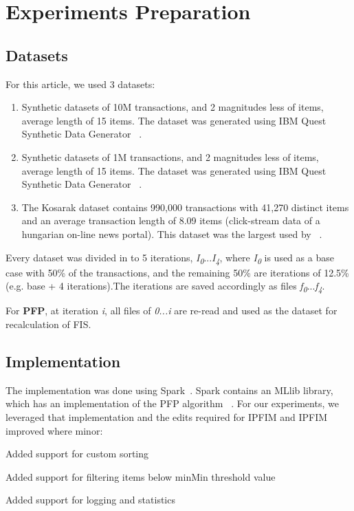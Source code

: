\section{Experiments Preparation}

\subsection{Datasets}
For this article, we used 3 datasets:
\begin{enumerate}
\item  \label{data:10Msynt} Synthetic datasets of 10M transactions, and 2 magnitudes less of items, average length of 15 items. The dataset was generated using IBM Quest Synthetic Data Generator ~\cite{agrawal1994quest}. 
\item \label{data:1Msynt} Synthetic datasets of 1M transactions, and 2 magnitudes less of items, average length of 15 items. The dataset was generated using IBM Quest Synthetic Data Generator ~\cite{agrawal1994quest}. 
\item \label{data:kosarak} The Kosarak dataset contains 990,000 transactions with 41,270 distinct items and an average transaction length of 8.09 items (click-stream data of a hungarian on-line news portal). This dataset was the largest used by ~\cite{tanbeer2009efficient}.
\end{enumerate}


Every dataset was divided in to 5 iterations, \textit{I\textsubscript{0}}...\textit{I\textsubscript{4}}, where \textit{I\textsubscript{0}} is used as a base case with 50\% of the transactions, and the remaining 50\% are iterations of 12.5\% (e.g. base + 4 iterations).The iterations are saved accordingly as files \textit{f\textsubscript{0}}...\textit{f\textsubscript{4}}. 

For \textbf{PFP}, at iteration \textit{i}, all files of \textit{0...i} are re-read and used as the dataset for recalculation of FIS.

\subsection{Implementation}
The implementation was done using Spark~\cite{spark}. Spark contains an MLlib library, which has an implementation of the PFP algorithm ~\cite{mllibpfp}. For our experiments, we leveraged that implementation and the edits required for IPFIM and IPFIM improved where minor:
\begin{steps}
\item Added support for custom sorting
\item Added support for filtering items below minMin threshold value
\item Added support for logging and statistics
\end{steps}


